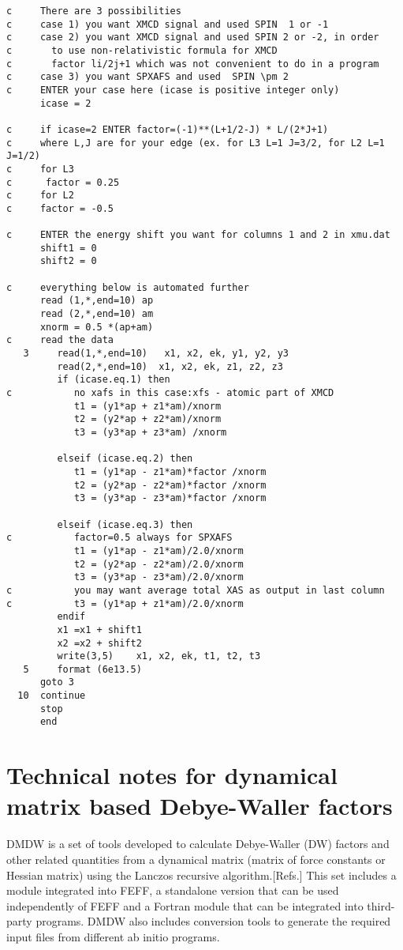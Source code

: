 \documentclass[11pt,oneside]{report} %
\begin{document}
\begin{latexonly}
\begin{verbatim}
c     There are 3 possibilities
c     case 1) you want XMCD signal and used SPIN  1 or -1
c     case 2) you want XMCD signal and used SPIN 2 or -2, in order
c       to use non-relativistic formula for XMCD
c       factor li/2j+1 which was not convenient to do in a program
c     case 3) you want SPXAFS and used  SPIN \pm 2
c     ENTER your case here (icase is positive integer only)
      icase = 2

c     if icase=2 ENTER factor=(-1)**(L+1/2-J) * L/(2*J+1)
c     where L,J are for your edge (ex. for L3 L=1 J=3/2, for L2 L=1 J=1/2)
c     for L3
c      factor = 0.25
c     for L2
c     factor = -0.5

c     ENTER the energy shift you want for columns 1 and 2 in xmu.dat
      shift1 = 0
      shift2 = 0

c     everything below is automated further
      read (1,*,end=10) ap
      read (2,*,end=10) am
      xnorm = 0.5 *(ap+am)
c     read the data
   3     read(1,*,end=10)   x1, x2, ek, y1, y2, y3
         read(2,*,end=10)  x1, x2, ek, z1, z2, z3
         if (icase.eq.1) then
c           no xafs in this case:xfs - atomic part of XMCD
            t1 = (y1*ap + z1*am)/xnorm
            t2 = (y2*ap + z2*am)/xnorm
            t3 = (y3*ap + z3*am) /xnorm

         elseif (icase.eq.2) then
            t1 = (y1*ap - z1*am)*factor /xnorm
            t2 = (y2*ap - z2*am)*factor /xnorm
            t3 = (y3*ap - z3*am)*factor /xnorm

         elseif (icase.eq.3) then
c           factor=0.5 always for SPXAFS
            t1 = (y1*ap - z1*am)/2.0/xnorm
            t2 = (y2*ap - z2*am)/2.0/xnorm
            t3 = (y3*ap - z3*am)/2.0/xnorm
c           you may want average total XAS as output in last column
c           t3 = (y1*ap + z1*am)/2.0/xnorm
         endif
         x1 =x1 + shift1
         x2 =x2 + shift2
         write(3,5)    x1, x2, ek, t1, t2, t3
   5     format (6e13.5)
      goto 3
  10  continue
      stop
      end
\end{verbatim}



\chapter{Technical notes for dynamical matrix based Debye-Waller factors}
\label{sec:Append-G-DMDW}
DMDW is a set of tools developed to calculate Debye-Waller (DW) factors and
other related quantities from a dynamical matrix (matrix of force constants or
Hessian matrix) using the Lanczos recursive algorithm.[Refs.] This set includes
a module integrated into FEFF, a standalone version that can be used
independently of FEFF and a Fortran module that can be integrated into
third-party programs. DMDW also includes conversion tools to generate the
required input files from different ab initio programs.


\end{latexonly}
\end{document}

